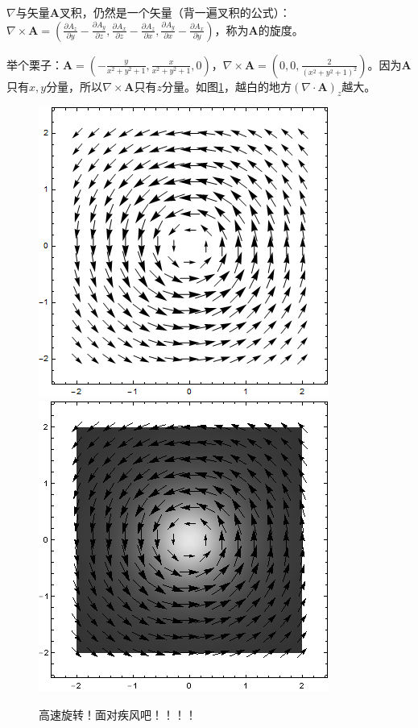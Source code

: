 $\nabla$与矢量$\mathbf{A}$叉积，仍然是一个矢量（背一遍叉积的公式）：$\nabla \times \mathbf{A}=(\frac{\partial A_z}{\partial y}-\frac{\partial A_y}{\partial z},\frac{\partial A_x}{\partial z}-\frac{\partial A_z}{\partial x},\frac{\partial A_y}{\partial x}-\frac{\partial A_x}{\partial y})$，称为$\mathbf{A}$的旋度。

举个栗子：$\mathbf{A}=(-\frac{y}{x^2+y^2+1},\frac{x}{x^2+y^2+1},0)$，$\nabla \times \mathbf{A}=(0,0,\frac{2}{(x^2+y^2+1)^2})$。因为$\mathbf{A}$只有$x,y$分量，所以$\nabla \times \mathbf{A}$只有$z$分量。如图\ref{fig-vec-curl}，越白的地方$(\nabla \cdot \mathbf{A})_z$越大。
\begin{figure}[htb]
\centering
\includegraphics[scale=0.5]{fig/vec-curl}
\includegraphics[scale=0.5]{fig/vec-curl-2}
\caption{高速旋转！面对疾风吧！！！！}
\label{fig-vec-curl}
\end{figure}

